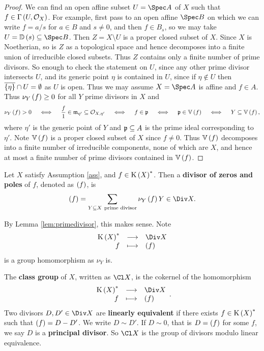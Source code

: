 \begin{proof}
We can find an open affine subset $ U = \Spec A $ of $ X $ such that $ f \in \Gamma\br{U, \OOO_X} $. For example, first pass to an open affine $ \Spec B $ on which we can write $ f = a / s $ for $ a \in B $ and $ s \ne 0 $, and then $ f \in B_s $, so we may take $ U = \DD\br{s} \subseteq \Spec B $. Then $ Z = X \setminus U $ is a proper closed subset of $ X $. Since $ X $ is Noetherian, so is $ Z $ as a topological space and hence decomposes into a finite union of irreducible closed subsets. Thus $ Z $ contains only a finite number of prime divisors. So enough to check the statement on $ U $, since any other prime divisor intersects $ U $, and its generic point $ \eta $ is contained in $ U $, since if $ \eta \notin U $ then $ \overline{\cbr{\eta}} \cap U = \emptyset $ as $ U $ is open. Thus we may assume $ X = \Spec A $ is affine and $ f \in A $. Thus $ \nu_Y\br{f} \ge 0 $ for all $ Y $ prime divisors in $ X $ and
$$ \nu_Y\br{f} > 0 \quad \iff \quad \dfrac{f}{1} \in \mmm_{\eta'} \subseteq \OOO_{X, \eta'} \quad \iff \quad f \in \ppp \quad \iff \quad \ppp \in \VV\br{f} \quad \iff \quad Y \subseteq \VV\br{f}, $$
where $ \eta' $ is the generic point of $ Y $ and $ \mathfrak{p} \subseteq A $ is the prime ideal corresponding to $ \eta' $. Note $ \VV\br{f} $ is a proper closed subset of $ X $ since $ f \ne 0 $. Thus $ \VV\br{f} $ decomposes into a finite number of irreducible components, none of which are $ X $, and hence at most a finite number of prime divisors contained in $ \VV\br{f} $.
\end{proof}

\begin{definition*}
Let $ X $ satisfy Assumption \ref{ass}, and $ f \in \K\br{X}^* $. Then a \textbf{divisor of zeros and poles} of $ f $, denoted as $ \br{f} $, is
$$ \br{f} = \sum_{Y \subseteq X \ \text{prime divisor}} \nu_Y\br{f}Y \in \Div X. $$
\end{definition*}

By Lemma \ref{lem:primedivisor}, this makes sense. Note
$$ \function{\K\br{X}^*}{\Div X}{f}{\br{f}} $$
is a group homomorphism as $ \nu_Y $ is.

\pagebreak

\begin{definition*}
The \textbf{class group} of $ X $, written as $ \Cl X $, is the cokernel of the homomorphism
$$ \function{\K\br{X}^*}{\Div X}{f}{\br{f}}. $$
Two divisors $ D, D' \in \Div X $ are \textbf{linearly equivalent} if there exists $ f \in \K\br{X}^* $ such that $ \br{f} = D - D' $. We write $ D \sim D' $. If $ D \sim 0 $, that is $ D = \br{f} $ for some $ f $, we say $ D $ is a \textbf{principal divisor}. So $ \Cl X $ is the group of divisors modulo linear equivalence.
\end{definition*}


